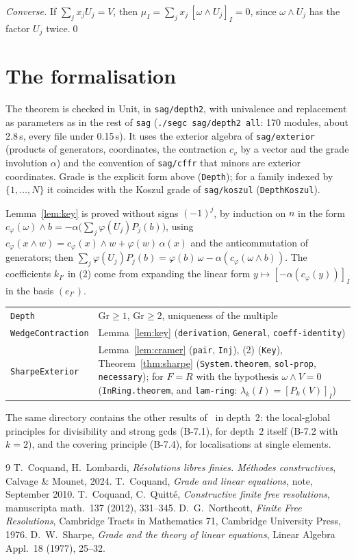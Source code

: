 \documentclass[11pt]{amsart}
\theoremstyle{definition}
\theoremstyle{remark}
\newcommand{\code}[1]{\texttt{#1}}
\newcommand{\Gr}{\mathrm{Gr}}
\newcommand{\co}[2]{[#1]_{#2}}
\begin{document}
\emph{Converse.}  If $\sum_jx_jU_j=V$, then
$\mu_I=\sum_jx_j\,\co{\omega\wedge U_j}I=0$, since $\omega\wedge U_j$ has the
factor $U_j$ twice.\qed

\section{The formalisation}

The theorem is checked in Unit, in \code{sag/depth2}, with univalence
and replacement as parameters as in the rest of \code{sag}
(\code{./segc sag/depth2 all}: 170 modules, about 2.8\,s, every file
under 0.15\,s).  It uses the exterior algebra of \code{sag/exterior}
(products of generators, coordinates, the contraction $c_v$ by a vector
and the grade involution $\alpha$) and the convention of \code{sag/cffr}
that minors are exterior coordinates.  Grade is the explicit form above
(\code{Depth}); for a family indexed by $\{1,\dots,N\}$ it coincides with
the Koszul grade of \code{sag/koszul} (\code{DepthKoszul}).

Lemma~\ref{lem:key} is proved without signs $(-1)^j$, by induction on $n$
in the form $c_\varphi(\omega)\wedge b=-\alpha\bigl(\sum_j\varphi(U_j)P_j(b)\bigr)$,
using $c_\varphi(x\wedge w)=c_\varphi(x)\wedge w+\varphi(w)\,\alpha(x)$ and
the anticommutation of generators; then
$\sum_j\varphi(U_j)P_j(b)=\varphi(b)\,\omega-\alpha(c_\varphi(\omega\wedge
b))$.  The coefficients $k_{I'}$ in (2) come from expanding the linear form
$y\mapsto\co{-\alpha(c_\varphi(y))}I$ in the basis $(e_{I'})$.

\medskip
\begin{tabular}{p{}p{}}
\code{Depth} & $\Gr\geq1$, $\Gr\geq2$, uniqueness of the multiple \\
\code{WedgeContraction} & Lemma~\ref{lem:key} (\code{derivation}, \code{General}, \code{coeff-identity}) \\
\code{SharpeExterior} & Lemma~\ref{lem:cramer} (\code{pair}, \code{Inj}), (2) (\code{Key}), Theorem~\ref{thm:sharpe} (\code{System.theorem}, \code{sol-prop}, \code{necessary}); for $F=R$ with the hypothesis $\omega\wedge V=0$ (\code{InRing.theorem}, and \code{lam-ring}: $\lambda_k(I)=\co{P_k(V)}I$)
\end{tabular}
\medskip

The same directory contains the other results of~\cite[B-7]{CL} in
depth~$2$: the local-global principles for divisibility and strong gcds
(B-7.1), for depth~$2$ itself (B-7.2 with $k=2$), and the covering
principle (B-7.4), for localisations at single elements.

\begin{thebibliography}{9}
 T.~Coquand, H.~Lombardi, \emph{R\'esolutions libres finies.
  M\'ethodes constructives}, Calvage \& Mounet, 2024.
 T.~Coquand, \emph{Grade and linear equations}, note,
  September 2010.
 T.~Coquand, C.~Quitt\'e, \emph{Constructive finite free
  resolutions}, manuscripta math.~137 (2012), 331--345.
 D.~G.~Northcott, \emph{Finite Free Resolutions},
  Cambridge Tracts in Mathematics 71, Cambridge University Press, 1976.
 D.~W.~Sharpe, \emph{Grade and the theory of linear
  equations}, Linear Algebra Appl.~18 (1977), 25--32.
\end{thebibliography}
\end{document}
